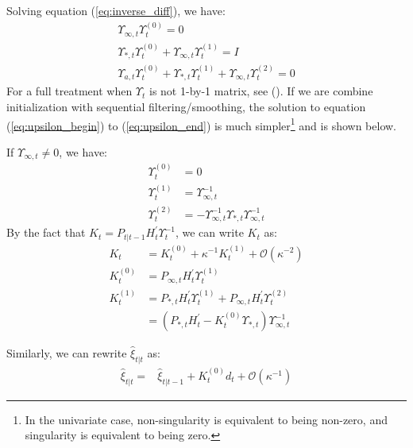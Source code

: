 \documentclass[10pt, titlepage]{article}
\numberwithin{equation}{section}
\begin{document}
Solving equation (\ref{eq:inverse_diff}), we have:
\begin{align}
    \Upsilon_{\infty,t}\Upsilon_t^{(0)} = 0 \label{eq:upsilon_begin} \\
    \Upsilon_{*,t}\Upsilon_t^{(0)} + \Upsilon_{\infty,t}\Upsilon_t^{(1)} = I \\
    \Upsilon_{a,t}\Upsilon_t^{(0)} + \Upsilon_{*,t}\Upsilon_t^{(1)} + \Upsilon_{\infty,t}\Upsilon_t^{(2)} = 0 \label{eq:upsilon_end}
\end{align}
For a full treatment when $\Upsilon_t$ is not 1-by-1 matrix, see (\cite{koopman_1997}). If we are combine initialization with sequential filtering/smoothing, the solution to equation (\ref{eq:upsilon_begin}) to (\ref{eq:upsilon_end}) is much simpler\footnote{In the univariate case, non-singularity is equivalent to being non-zero, and singularity is equivalent to being zero.} and is shown below.

If $\Upsilon_{\infty,t}\neq 0$, we have:
\begin{align*}
    \Upsilon_t^{(0)} &= 0 \\
    \Upsilon_t^{(1)} &= \Upsilon_{\infty,t}^{-1} \\
    \Upsilon_t^{(2)} &= -\Upsilon_{\infty,t}^{-1}\Upsilon_{*,t}\Upsilon_{\infty,t}^{-1}
\end{align*}
By the fact that $K_t = P_{t|t-1}H_t^{'}\Upsilon_t^{-1}$, we can write $K_t$ as:
\begin{align}
    K_t &= K_t^{(0)} + \kappa^{-1}K_t^{(1)} + \mathcal{O}(\kappa^{-2}) \label{eq:K1_diffuse_start} \\
    K_t^{(0)} &= P_{\infty,t}H_t^{'}\Upsilon_t^{(1)} \\
    K_t^{(1)} &= P_{*,t}H_t^{'}\Upsilon_t^{(1)} + P_{\infty,t}H_t^{'}\Upsilon_t^{(2)} \nonumber \\
    &= (P_{*,t}H_t^{'}-K_t^{(0)}\Upsilon_{*,t})\Upsilon_{\infty,t}^{-1} \label{eq:K1_diffuse_end}
\end{align}

Similarly, we can rewrite $\hat{\xi}_{t|t}$ as:
\begin{align}
    \hat{\xi}_{t|t} =& \hat{\xi}_{t|t-1} + K_t^{(0)}d_t + \mathcal{O}(\kappa^{-1}) \label{eq:diff_xi1} 
\end{align}
\end{document}
